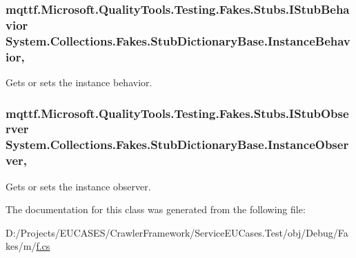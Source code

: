 \hypertarget{class_system_1_1_collections_1_1_fakes_1_1_stub_dictionary_base_ad539cfa3759611a2c353268641095fb9}{
\subsubsection[{Instance\-Behavior}]{\setlength{\rightskip}{0pt plus 5cm}mqttf.\-Microsoft.\-Quality\-Tools.\-Testing.\-Fakes.\-Stubs.\-I\-Stub\-Behavior System.\-Collections.\-Fakes.\-Stub\-Dictionary\-Base.\-Instance\-Behavior\hspace{0.3cm}{\ttfamily [get]}, {\ttfamily [set]}}}\label{class_system_1_1_collections_1_1_fakes_1_1_stub_dictionary_base_ad539cfa3759611a2c353268641095fb9}


Gets or sets the instance behavior.

\hypertarget{class_system_1_1_collections_1_1_fakes_1_1_stub_dictionary_base_a46ee534b1bd0d8ae218bac1dec48f6b6}{
\subsubsection[{Instance\-Observer}]{\setlength{\rightskip}{0pt plus 5cm}mqttf.\-Microsoft.\-Quality\-Tools.\-Testing.\-Fakes.\-Stubs.\-I\-Stub\-Observer System.\-Collections.\-Fakes.\-Stub\-Dictionary\-Base.\-Instance\-Observer\hspace{0.3cm}{\ttfamily [get]}, {\ttfamily [set]}}}\label{class_system_1_1_collections_1_1_fakes_1_1_stub_dictionary_base_a46ee534b1bd0d8ae218bac1dec48f6b6}


Gets or sets the instance observer.



The documentation for this class was generated from the following file\-:\begin{DoxyCompactItemize}
\item 
D\-:/\-Projects/\-E\-U\-C\-A\-S\-E\-S/\-Crawler\-Framework/\-Service\-E\-U\-Cases.\-Test/obj/\-Debug/\-Fakes/m/\hyperlink{m_2f_8cs}{f.\-cs}\end{DoxyCompactItemize}
